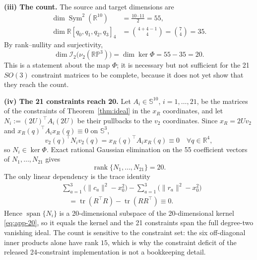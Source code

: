 \textbf{(iii) The count.} The source and target dimensions are
\begin{equation}
\begin{split}
\dim\operatorname{Sym}^2(\mathbb{R}^{10})&=\frac{10\cdot11}{2}=55,\\
\dim\mathbb{R}[q_0,q_1,q_2,q_3]_4&=\binom{4+4-1}{4}=\binom74=35 .
\end{split}
\label{eq:app-dims}
\end{equation}
By rank--nullity and surjectivity,
\begin{equation}
\dim\mathcal{I}_2\big(\nu_2(\mathbb{RP}^3)\big)=\dim\ker\Phi=55-35=20 .
\label{eq:app-20}
\end{equation}
This is a statement about the map $\Phi$; it is necessary but not sufficient for the 21 $SO(3)$ constraint matrices to be complete, because it does not yet show that they reach the count.

\textbf{(iv) The 21 constraints reach 20.} Let $A_i\in\mathbb{S}^{10}$, $i=1,\dots,21$, be the matrices of the constraints of Theorem~\ref{thm:ideal} in the $x_R$ coordinates, and let $N_i:=(2U)^\top A_i(2U)$ be their pullbacks to the $v_2$ coordinates. Since $x_R=2Uv_2$ and $x_R(q)^\top A_ix_R(q)\equiv0$ on $\mathbb{S}^3$,
\begin{equation}
v_2(q)^\top N_iv_2(q)=x_R(q)^\top A_ix_R(q)\equiv0\quad\forall q\in\mathbb{R}^4,
\label{eq:app-pullback}
\end{equation}
so $N_i\in\ker\Phi$. Exact rational Gaussian elimination on the 55 coefficient vectors of $N_1,\dots,N_{21}$ gives
\begin{equation}
\operatorname{rank}\{N_1,\dots,N_{21}\}=20 .
\label{eq:app-rank}
\end{equation}
The only linear dependency is the trace identity
\begin{equation}
\begin{split}
&\sum_{a=1}^{3}\big(\|c_a\|^2-x_0^2\big)-\sum_{a=1}^{3}\big(\|r_a\|^2-x_0^2\big)\\
&\quad=\operatorname{tr}(R^\top R)-\operatorname{tr}(RR^\top)\equiv0 .
\end{split}
\label{eq:app-dependency}
\end{equation}
Hence $\operatorname{span}\{N_i\}$ is a 20-dimensional subspace of the 20-dimensional kernel \eqref{eq:app-20}, so it equals the kernel and the 21 constraints span the full degree-two vanishing ideal. The count is sensitive to the constraint set: the six off-diagonal inner products alone have rank $15$, which is why the constraint deficit of the released 24-constraint implementation is not a bookkeeping detail.

